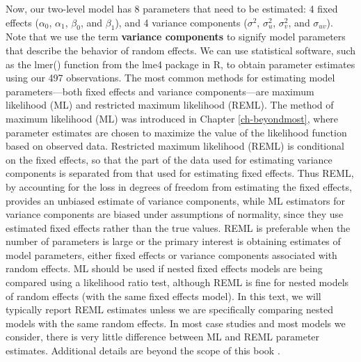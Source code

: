 \documentclass[
]{krantz}
\begin{document}
Now, our two-level model has 8 parameters that need to be estimated: 4 fixed effects (\(\alpha_{0}\), \(\alpha_{1}\), \(\beta_{0}\), and \(\beta_{1}\)), and 4 variance components (\(\sigma^{2}\), \(\sigma_{u}^{2}\), \(\sigma_{v}^{2}\), and \(\sigma_{uv}\)). Note that we use the term \textbf{variance components} to signify model parameters that describe the behavior of random effects. We can use statistical software, such as the lmer() function from the lme4 package in R, to obtain parameter estimates using our 497 observations. The most common methods for estimating model parameters---both fixed effects and variance components---are maximum likelihood (ML) and restricted maximum likelihood (REML). The method of maximum likelihood (ML) was introduced in Chapter \ref{ch-beyondmost}, where parameter estimates are chosen to maximize the value of the likelihood function based on observed data. Restricted maximum likelihood (REML) is conditional on the fixed effects, so that the part of the data used for estimating variance components is separated from that used for estimating fixed effects. Thus REML, by accounting for the loss in degrees of freedom from estimating the fixed effects, provides an unbiased estimate of variance components, while ML estimators for variance components are biased under assumptions of normality, since they use estimated fixed effects rather than the true values. REML is preferable when the number of parameters is large or the primary interest is obtaining estimates of model parameters, either fixed effects or variance components associated with random effects. ML should be used if nested fixed effects models are being compared using a likelihood ratio test, although REML is fine for nested models of random effects (with the same fixed effects model). In this text, we will typically report REML estimates unless we are specifically comparing nested models with the same random effects. In most case studies and most models we consider, there is very little difference between ML and REML parameter estimates. Additional details are beyond the scope of this book \citep{Singer2003}.
\end{document}
